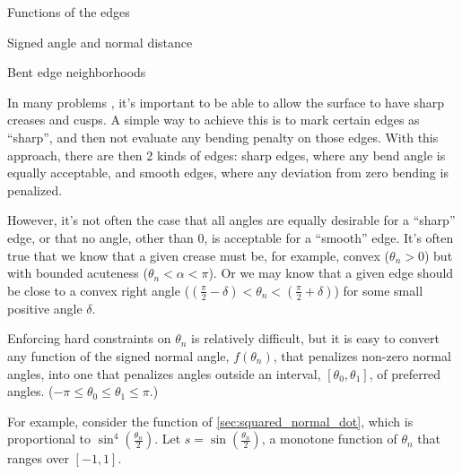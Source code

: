 \begin{plSection}{Functions of the edges}
\begin{plSection}{Signed angle and normal distance}
\end{plSection}%

\begin{plSection}{Bent edge neighborhoods}
\label{sec:Bent-edge-neighborhoods}

In many problems \cite{HoppeEtal:1994:SIGGRAPH,Hoppe:1994:Phd},
it's important to be able to allow the surface to have
sharp creases and cusps.
A simple way to achieve this is to mark
certain edges as ``sharp'',
and then not evaluate any bending penalty
on those edges.
With this approach, there are then 2 kinds of edges:
sharp edges, where any bend angle is equally acceptable,
and smooth edges, 
where any deviation from zero bending is penalized.

However, it's not often the case that all angles
are equally desirable for a ``sharp'' edge,
or that no angle, other than $0$, is acceptable
for a ``smooth'' edge.
It's often true that we know that a given crease
must be, for example, convex ($\theta_n > 0$)
but with bounded acuteness ($\theta_n < \alpha < \pi$).
Or we may know that a given edge should be close to
a convex right angle 
($\left( \frac{\pi}{2} - \delta \right) 
< \theta_n < 
\left( \frac{\pi}{2} + \delta \right)$)
for some small positive angle $\delta$.

Enforcing hard constraints on $\theta_n$
is relatively difficult,
but it is easy to convert any function
of the signed normal angle, $f(\theta_n)$,
that penalizes non-zero normal angles,
into one that penalizes angles 
outside an interval, $\left[\theta_0,\theta_1\right]$,
of preferred angles.
($-\pi \leq \theta_0 \leq \theta_1 \leq \pi$.)

For example,
consider the function of \cref{sec:squared_normal_dot},
which is proportional to $\sin^4(\frac{\theta_n}{2})$. 
Let $s = \sin(\frac{\theta_n}{2})$,
a monotone function of $\theta_n$ 
that ranges over $\left[ -1, 1 \right]$.


\end{plSection}
\end{plSection}
